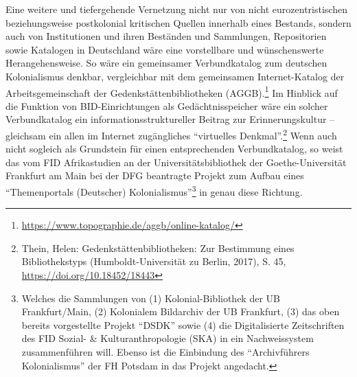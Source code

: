 \documentclass[a4paper,
fontsize=11pt,
oneside,
numbers=noperiodatend,
parskip=half-,
bibliography=totoc,
final
]{scrartcl}
\begin{document}
Eine weitere und tiefergehende Vernetzung nicht nur von nicht
eurozentristischen beziehungsweise postkolonial kritischen Quellen
innerhalb eines Bestands, sondern auch von Institutionen und ihren
Beständen und Sammlungen, Repositorien sowie Katalogen in Deutschland
wäre eine vorstellbare und wünschenswerte Herangehensweise. So wäre ein
gemeinsamer Verbundkatalog zum deutschen Kolonialismus denkbar,
vergleichbar mit dem gemeinsamen Internet-Katalog der
Arbeitsgemeinschaft der Gedenkstättenbibliotheken (AGGB).\footnote{\url{https://www.topographie.de/aggb/online-katalog/}}
Im Hinblick auf die Funktion von BID-Einrichtungen als
Gedächtnisspeicher wäre ein solcher Verbundkatalog ein
informationsstruktureller Beitrag zur Erinnerungskultur -- gleichsam ein
allen im Internet zugängliches \enquote{virtuelles Denkmal}.\footnote{Thein,
  Helen: Gedenkstättenbibliotheken: Zur Bestimmung eines Bibliothekstyps
  (Humboldt-Universität zu Berlin, 2017), S. 45,
  \url{https://doi.org/10.18452/18443}} Wenn auch
nicht sogleich als Grundstein für einen entsprechenden Verbundkatalog,
so weist das vom FID Afrikastudien an der Universitätsbibliothek der
Goethe-Universität Frankfurt am Main bei der DFG beantragte Projekt zum
Aufbau eines \enquote{Themenportals (Deutscher)
Kolonialismus}\footnote{Welches die Sammlungen von (1)
  Kolonial-Bibliothek der UB Frankfurt/Main, (2) Kolonialem Bildarchiv
  der UB Frankfurt, (3) das oben bereits vorgestellte Projekt
  \enquote{DSDK} sowie (4) die Digitalisierte Zeitschriften des FID
  Sozial- \& Kulturanthropologie (SKA) in ein Nachweissystem
  zusammenführen will. Ebenso ist die Einbindung des
  \enquote{Archivführers Kolonialismus} der FH Potsdam in das Projekt
  angedacht.} in genau diese Richtung.
\end{document}

